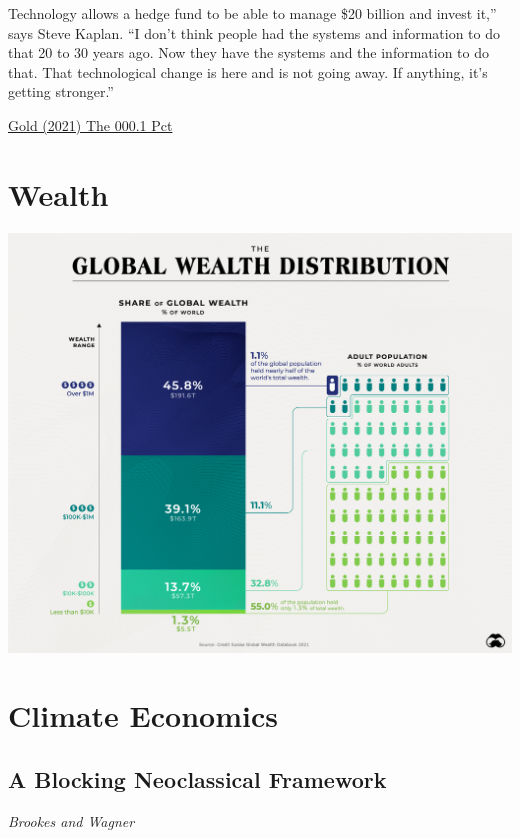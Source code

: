 \documentclass[
]{book}
\begin{document}
Technology allows a hedge fund to be able to manage \$20 billion and invest it,'' says Steve Kaplan. ``I don't think people had the systems and information to do that 20 to 30 years ago. Now they have the systems and the information to do that. That technological change is here and is not going away. If anything, it's getting stronger.''

\href{https://review.chicagobooth.edu/economics/2017/article/never-mind-1-percent-lets-talk-about-001-percent}{Gold (2021) The 000.1 Pct}

\hypertarget{wealth}{%
\chapter{Wealth}\label{wealth}}

\includegraphics{fig/global_wealth_distribution.jpeg}

\hypertarget{climate-economics}{%
\chapter{Climate Economics}\label{climate-economics}}

\hypertarget{a-blocking-neoclassical-framework}{%
\section{A Blocking Neoclassical Framework}\label{a-blocking-neoclassical-framework}}

\emph{Brookes and Wagner}
\end{document}
